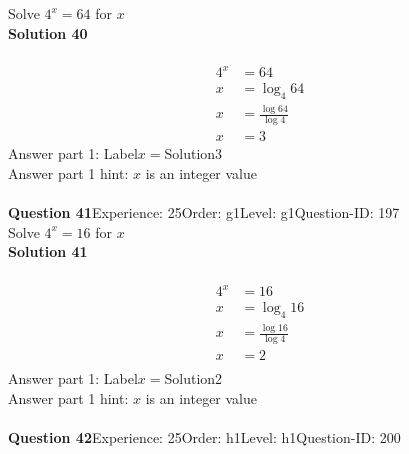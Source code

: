 \documentclass{article}
\begin{document}
Solve $4^x=64$ for $x$\\[4pt]
\noindent\textbf{Solution 40}\\[2pt]
\\[-35pt]\begin{align*}
4^x&=64\\[2pt]
x&=\log_{4}64\\[2pt]
x&=\displaystyle\frac{\log64}{\log4}\\[2pt]
x&=3
\end{align*}
Answer part 1: \hspace{10pt}Label\hspace{10pt}$x=$\hspace{10pt}Solution\hspace{10pt}3\\
Answer part 1 hint: \hspace{15pt}$x$ is an integer value\\
\\[4pt]
\noindent\textbf{Question 41}\hspace{20pt}Experience: 25\hspace{20pt}Order: g1\hspace{20pt}Level: g1\hspace{20pt}Question-ID: 197\\[2pt]
Solve $4^x=16$ for $x$\\[4pt]
\noindent\textbf{Solution 41}\\[2pt]
\\[-35pt]\begin{align*}
4^x&=16\\[2pt]
x&=\log_{4}16\\[2pt]
x&=\displaystyle\frac{\log16}{\log4}\\[2pt]
x&=2\\[-105pt]
\end{align*}
Answer part 1: \hspace{10pt}Label\hspace{10pt}$x=$\hspace{10pt}Solution\hspace{10pt}2\\
Answer part 1 hint: \hspace{15pt}$x$ is an integer value\\
\\[4pt]
\noindent\textbf{Question 42}\hspace{20pt}Experience: 25\hspace{20pt}Order: h1\hspace{20pt}Level: h1\hspace{20pt}Question-ID: 200\\[2pt]
\end{document}
